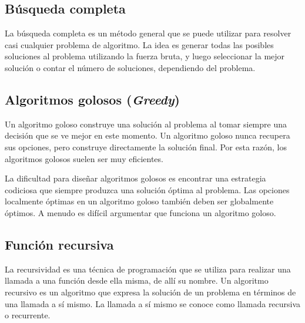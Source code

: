 \subsection{Búsqueda completa}
La búsqueda completa es un método general que se puede utilizar para resolver casi cualquier
 problema de algoritmo. La idea es generar todas las posibles soluciones al problema utilizando la
 fuerza bruta, y luego seleccionar la mejor solución o contar el número de soluciones, dependiendo
del problema.

\subsection{Algoritmos golosos (\emph{Greedy})}
Un algoritmo goloso construye una solución al problema al tomar siempre una decisión que se ve mejor en este momento. Un algoritmo goloso nunca recupera sus opciones, pero construye directamente la solución final. Por esta razón, los algoritmos golosos suelen ser muy eficientes.

La dificultad para diseñar algoritmos golosos es encontrar una estrategia codiciosa que siempre produzca una solución óptima al problema. Las opciones localmente óptimas en un algoritmo goloso también deben ser globalmente óptimos. A menudo es difícil argumentar que funciona un algoritmo goloso.

\subsection{Función recursiva}
La recursividad es una técnica de programación que se utiliza para realizar una llamada a una
 función desde ella misma, de allí su nombre. Un algoritmo recursivo es un algoritmo que expresa la solución de un problema en términos
de una llamada a sí mismo. La llamada a sí mismo se conoce como llamada recursiva o recurrente.